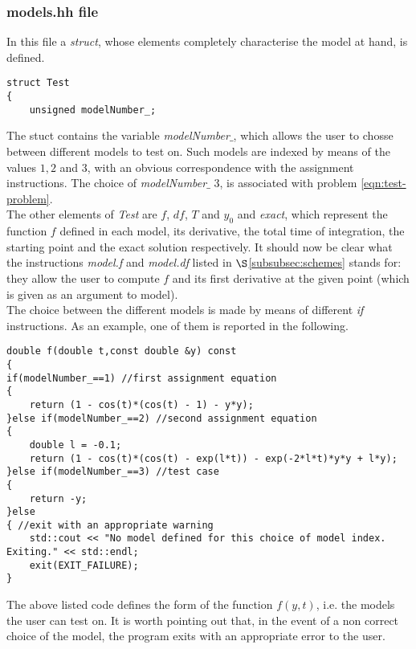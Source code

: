 \documentclass[11pt]{article}
\theoremstyle{theorem}
\theoremstyle{definition}
\begin{document}
\subsubsection{models.hh file}
\label{subsubsec:models}
In this file a \emph{struct}, whose elements completely characterise the model at hand, is defined.

\begin{lstlisting}
struct Test
{
	unsigned modelNumber_;
\end{lstlisting}

The stuct contains the variable \emph{modelNumber$\_$}, which allows the user to chosse between different models to test on. Such models are indexed by means of the values $1, 2$ and $3$, with an obvious correspondence with the assignment instructions. The choice of \emph{modelNumber$\_$} 3, is associated with problem \eqref{eqn:test-problem}.\\
The other elements of \emph{Test} are $f$, $df$, $T$ and $y_0$ and \emph{exact}, which represent the function $f$ defined in each model, its derivative, the total time of integration, the starting point and the exact solution respectively. It should now be clear what the instructions \emph{model.f} and \emph{model.df} listed in $\S$\ref{subsubsec:schemes} stands for: they allow the user to compute $f$ and its first derivative at the given point (which is given as an argument to model).\\
The choice between the different models is made by means of different \emph{if} instructions. As an example, one of them is reported in the following.\\

\begin{lstlisting}
double f(double t,const double &y) const
{
if(modelNumber_==1) //first assignment equation
{
	return (1 - cos(t)*(cos(t) - 1) - y*y);
}else if(modelNumber_==2) //second assignment equation
{
	double l = -0.1;
	return (1 - cos(t)*(cos(t) - exp(l*t)) - exp(-2*l*t)*y*y + l*y);
}else if(modelNumber_==3) //test case
{
	return -y;
}else
{ //exit with an appropriate warning
	std::cout << "No model defined for this choice of model index. Exiting." << std::endl;
	exit(EXIT_FAILURE);
}
\end{lstlisting}

The above listed code defines the form of the function $f(y,t)$, i.e. the models the user can test on. It is worth pointing out that, in the event of a non correct choice of the model, the program exits with an appropriate error to the user.\\
\end{document}
